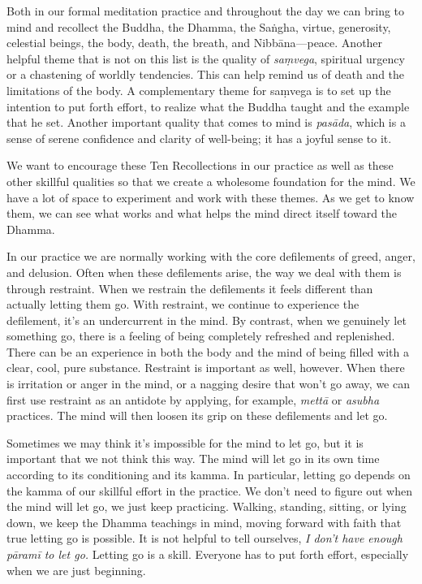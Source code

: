 Both in our formal meditation practice and throughout the day we can 
bring to mind and recollect the Buddha, the Dhamma, the Saṅgha, 
virtue, generosity, celestial beings, the body, death, the breath, and 
Nibbāna---peace. Another helpful theme that is not on this list is the 
quality of \emph{saṃvega}, spiritual urgency or a chastening of 
worldly tendencies. This can help remind us of death and the 
limitations of the body. A complementary theme for saṃvega is to set 
up the intention to put forth effort, to realize what the Buddha taught 
and the example that he set. Another important quality that comes to 
mind is \emph{pasāda}, which is a sense of serene confidence and 
clarity of well-being; it has a joyful sense to it.

We want to encourage these Ten Recollections in our practice as well as 
these other skillful qualities so that we create a wholesome foundation 
for the mind. We have a lot of space to experiment and work with these 
themes. As we get to know them, we can see what works and what helps 
the mind direct itself toward the Dhamma.


In our practice we are normally working with the core defilements of 
greed, anger, and delusion. Often when these defilements arise, the way 
we deal with them is through restraint. When we restrain the 
defilements it feels different than actually letting them go. With 
restraint, we continue to experience the defilement, it's an 
undercurrent in the mind. By contrast, when we genuinely let something 
go, there is a feeling of being completely refreshed and replenished. 
There can be an experience in both the body and the mind of being 
filled with a clear, cool, pure substance. Restraint is important as 
well, however. When there is irritation or anger in the mind, or a 
nagging desire that won't go away, we can first use restraint as an 
antidote by applying, for example, \emph{mettā} or \emph{asubha} 
practices. The mind will then loosen its grip on these defilements and 
let go.

Sometimes we may think it's impossible for the mind to let go, but it 
is important that we not think this way. The mind will let go in its 
own time according to its conditioning and its kamma. In particular, 
letting go depends on the kamma of our skillful effort in the practice. 
We don't need to figure out when the mind will let go, we just keep 
practicing. Walking, standing, sitting, or lying down, we keep the 
Dhamma teachings in mind, moving forward with faith that true letting 
go is possible. It is not helpful to tell ourselves, \emph{I don't have 
enough pāramī to let go.} Letting go is a skill. Everyone has to put 
forth effort, especially when we are just beginning.

